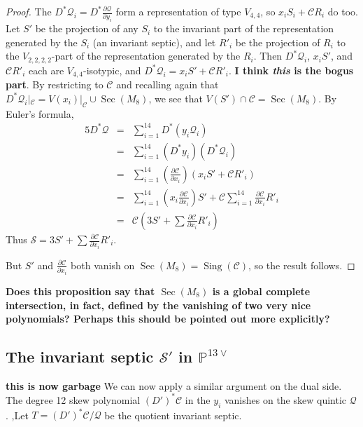 \documentclass{amsart}
\theoremstyle{definition}
\theoremstyle{remark}
\DeclareMathOperator{\Sing}{Sing}
\DeclareMathOperator{\Sec}{Sec}
\def\proj{\mathbb{P}}
\def\cubic{\mathcal{C}}
\def\quintic{\mathcal{Q}}
\def\septic{\mathcal{S}}
\begin{document}
{\begin{proof}
The $D^* \quintic_i = D^* \frac { \partial \quintic} {\partial y_i}$ form a  representation of
type $V_{4,4}$, so $x_i S_i + \cubic R_i$ do  too.  Let $S'$ be the
projection of any $S_i$ to the invariant part of the representation
generated by the $S_i$ (an invariant septic), and let $R'_i$ be the projection of $R_i$ to
the $V_{2,2,2,2}$-part of the representation generated by the $R_i$. 
Then  $D^* \quintic_i$, $x_i S'$, and $\cubic R'_i$ each are 
$V_{4,4}$-isotypic, and $D^* \quintic_i = x_i S' + \cubic R'_i$.  {\bf
  I think \emph{this} is the bogus part}.
By restricting to $\cubic$ and recalling again that $D^* \quintic_i
|_{\cubic} = V(x_i)|_{\cubic} \cup \Sec (
M_8)$, we see that $V(S') \cap \cubic = \Sec (M_8)$.
By Euler's formula,
\begin{eqnarray*}
5 D^* \quintic &=& \sum_{i=1}^{14} D^* \left( y_i \quintic_i  \right)\\
&=& \sum_{i=1}^{14} \left( D^* y_i \right) \left( D^* \quintic_i
\right) \\
&=& \sum_{i=1}^{14}  \left(   \frac {\partial \cubic} {\partial x_i}
\right)  \left(  x_i S' + \cubic R'_i \right) \\
&=& \sum_{i=1}^{14}  \left(  x_i \frac {\partial \cubic} {\partial x_i}
\right)  S'
    + \cubic \sum_{i=1}^{14}  \frac {\partial \cubic} {\partial x_i}  R'_i \\
&=& \cubic \left(  3 S'  + \sum  \frac {\partial \cubic} {\partial x_i}  R'_i
\right)
\end{eqnarray*}
Thus $\septic = 3 S' + \sum \frac{ \partial \cubic} {\partial x_i}   R'_i$.

But $S'$ and $\frac {\partial \cubic} {\partial x_i}$ both vanish on
$\Sec(M_8) = \Sing(\cubic)$, so the result follows.
\end{proof}

{\bf Does this proposition say that $\Sec(M_8)$ is a global complete intersection, in fact, defined by the vanishing
of two very nice polynomials?  Perhaps this should be pointed out more explicitly?}

\subsection{The invariant septic $\septic'$ in $\proj^{13 \vee}$}

{\bf this is now garbage}
We can now apply a similar argument on the dual side.
The degree 12 skew polynomial $(D')^* \cubic$ in the $y_i$ vanishes on
the skew quintic $\quintic$. ,Let
$T = (D')^* \cubic/ \quintic$ be the quotient invariant septic.

}
\end{document}
